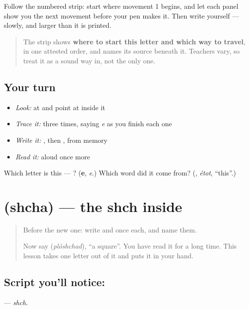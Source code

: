 Follow the numbered strip: start where movement 1 begins, and let each panel show you the next movement before your pen makes it. Then write  yourself — slowly, and larger than it is printed.

\begin{quote}
The strip shows \textbf{where to start this letter and which way to travel}, in one attested order, and names its source beneath it. Teachers vary, so treat it as a sound way in, not the only one.
\end{quote}

\subsection*{Your turn}
\begin{itemize}
\raggedright
  \item \emph{Look:} at \textbf{} and point at  inside it
  \item \emph{Trace it:}  three times, saying \emph{e} as you finish each one
  \item \emph{Write it:} , then , from memory
  \item \emph{Read it:} \textbf{} aloud once more
\end{itemize}

\begin{tcolorbox}[breakable,colback=teal!4,colframe=teal!35!black,title={Before you move on}]
Which letter is this — ? (\textbf{e}, \emph{e}.) Which word did it come from? (\textbf{}, \emph{étot}, \textquotedblleft{}this\textquotedblright{}.)
\end{tcolorbox}
\section[\texorpdfstring{\ru{щ} (shcha)}{щ (shcha)}]{ (shcha) — the shch inside }

\label{lesson:RU-W93-shcha}



\begin{quote}
Before the new one: write  and  once each, and name them.

Now say \textbf{} (\emph{plóshchad}), \textquotedblleft{}a square\textquotedblright{}. You have read it for a long time. This lesson takes one letter out of it and puts it in your hand.
\end{quote}

\subsection*{Script you'll notice: }
\textbf{} — \emph{shch}.


